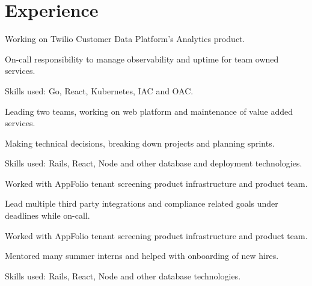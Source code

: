 \section{Experience}

    \begin{tightemize}
      \item Working on Twilio Customer Data Platform's Analytics product.
      \item On-call responsibility to manage observability and uptime for team owned services.
      \item Skills used: Go, React, Kubernetes, IAC and OAC.
    \end{tightemize} 
    \sectionsep

    \begin{tightemize}
      \item Leading two teams, working on web platform and maintenance of value added services.
      \item Making technical decisions, breaking down projects and planning sprints.
      \item Skills used: Rails, React, Node and other database and deployment technologies.
    \end{tightemize} 
    \sectionsep

    \begin{tightemize}
      \item Worked with AppFolio tenant screening product infrastructure and product team.
      \item Lead multiple third party integrations and compliance related goals under deadlines while on-call.
    \end{tightemize} 
    \sectionsep

    \begin{tightemize}
      \item Worked with AppFolio tenant screening product infrastructure and product team.
      \item Mentored many summer interns and helped with onboarding of new hires.
      \item Skills used: Rails, React, Node and other database technologies.
    \end{tightemize}
    \sectionsep

